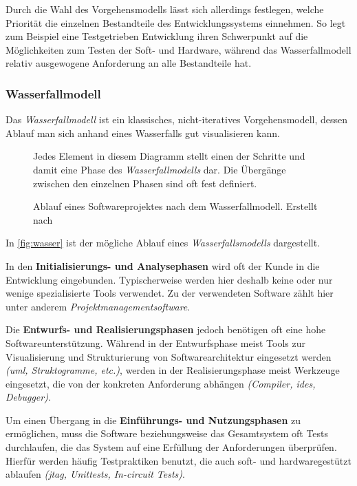 Durch die Wahl des Vorgehensmodells lässt sich allerdings festlegen, welche
Priorität die einzelnen Bestandteile des Entwicklungssystems einnehmen. So legt
zum Beispiel eine Testgetrieben Entwicklung ihren Schwerpunkt auf die
Möglichkeiten zum Testen der Soft- und Hardware, während das Wasserfallmodell
relativ ausgewogene Anforderung an alle Bestandteile hat.

\subsubsection*{Wasserfallmodell}
Das \emph{Wasserfallmodell} ist ein klassisches, nicht-iteratives
Vorgehensmodell, dessen Ablauf man sich anhand eines Wasserfalls gut visualisieren kann. 

\begin{figure}[!ht]
\centering
\def\svgwidth{\columnwidth}

\caption{Ablauf eines Softwareprojektes nach dem Wasserfallmodell. Erstellt nach
\cite{WP01}}{Jedes Element in diesem Diagramm stellt einen der Schritte und
damit eine Phase des \emph{Wasserfallmodells} dar. Die Übergänge zwischen den
einzelnen Phasen sind oft fest definiert.}
\label{fig:wasser}
\end{figure}

In \autoref{fig:wasser} ist der mögliche Ablauf eines \emph{Wasserfallsmodells}
dargestellt.

In den \textbf{Initialisierungs- und Analysephasen} wird oft der Kunde in die
Entwicklung eingebunden. Typischerweise werden hier deshalb keine oder nur
wenige spezialisierte Tools verwendet. Zu der verwendeten Software zählt hier
unter anderem \emph{Projektmanagementsoftware}.

Die \textbf{Entwurfs- und Realisierungsphasen} jedoch benötigen oft eine hohe
Softwareunterstützung. Während in der Entwurfsphase meist Tools zur
Visualisierung und Strukturierung von Softwarearchitektur eingesetzt werden
\emph{(\gls{uml}, Struktogramme, etc.)}, werden in der Realisierungsphase
meist Werkzeuge eingesetzt, die von der konkreten Anforderung abhängen
\emph{(Compiler, \glspl{ide}, Debugger)}.

Um einen Übergang in die \textbf{Einführungs- und Nutzungsphasen} zu
ermöglichen, muss die Software beziehungsweise das Gesamtsystem oft Tests durchlaufen, die das
System auf eine Erfüllung der Anforderungen überprüfen. Hierfür werden
häufig Testpraktiken benutzt, die auch soft- und hardwaregestützt
ablaufen \emph{(\gls{jtag}, Unittests, In-circuit Tests)}.

